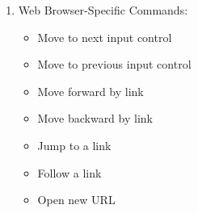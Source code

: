 \documentclass[10pt,letterpaper,twoside]{report}
\begin{document}
{\begin{enumerate}
	      \begin{itemize}
		      \item Clear calculation 
		      \item Delete the last key pressed 
		      \item For addition  
		      \item For subtraction 
		      \item For multiplication 
		      \item For division 
		      \item For the decimal point 
		      \item To clear the last number or operator 
		      \item Toggle display result or input 
	      \end{itemize}
	\item Web Browser-Specific Commands:
	      \begin{itemize}
		      \item Move to next input control 
		      \item Move to previous input control 
		      \item Move forward by link 
		      \item Move backward by link 
		      \item Jump to a link 
		      \item Follow a link 
		      \item Open new URL  

\end{itemize}
\end{enumerate}}
\end{document}
